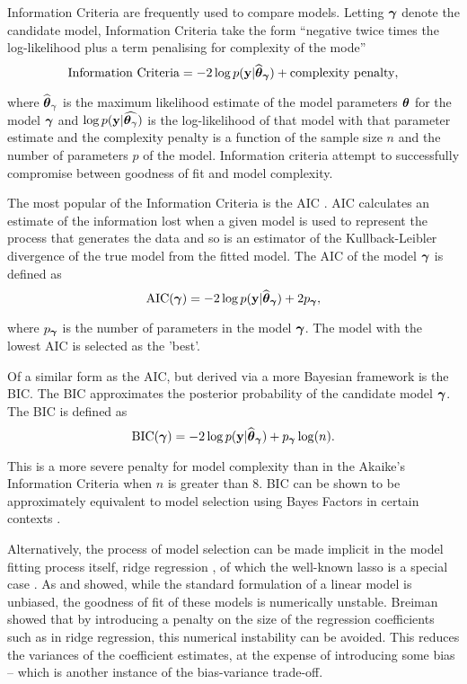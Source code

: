 
Information Criteria are frequently used to compare models. Letting ${\boldsymbol \gamma}$
denote the candidate model, Information Criteria take the form ``negative twice
times the log-likelihood plus a term penalising for complexity of the mode''
$$
	\text{Information Criteria} = -2 \log p({\bf y} | \widehat{{\boldsymbol \theta}}_{\boldsymbol \gamma}) + \text{complexity penalty},
$$

\noindent where $\widehat{{\boldsymbol \theta}}_{\gamma}$ is the maximum likelihood estimate of
the model parameters ${\boldsymbol \theta}$ for the model ${\boldsymbol \gamma}$ and $\log p({\bf y} |
\widehat{{\boldsymbol \theta}_\gamma})$ is the log-likelihood of that model with that
parameter estimate and the complexity penalty is a function of the sample size
$n$ and the number of parameters $p$ of the model. Information criteria attempt
to successfully compromise between goodness of fit and model complexity.

The most popular of the Information Criteria is the 
AIC \citep{Akaike1974}. AIC calculates an estimate of the information lost
when a given model is used to represent the process that generates the data and
so is an estimator of the Kullback-Leibler divergence of the true model from the
fitted model. The AIC of the model ${\boldsymbol \gamma}$ is defined as
$$
	\text{AIC}({\boldsymbol \gamma}) = -2 \log p({\bf y} | \widehat{{\boldsymbol \theta}}_{\boldsymbol \gamma}) + 2 p_{\boldsymbol \gamma},
$$

\noindent where $p_{\boldsymbol \gamma}$ is the number of parameters in the model ${\boldsymbol \gamma}$.
The model with the lowest AIC is selected as the 'best'.

Of a similar form as the AIC, but derived via a more Bayesian framework is the
BIC. The BIC approximates the posterior
probability of the candidate model ${\boldsymbol \gamma}$. The BIC is defined as
$$
	\text{BIC}({\boldsymbol \gamma}) = -2 \log p({\bf y} | \widehat{{\boldsymbol \theta}}_{\boldsymbol \gamma}) + p_{\boldsymbol \gamma} \log(n).
$$

\noindent This is a more severe penalty for model complexity than in the
Akaike's Information Criteria when $n$ is greater than $8$. BIC can be shown to
be approximately equivalent to model selection using Bayes Factors in certain
contexts \citep{Kass1993}.

Alternatively, the process of model selection can be made implicit in the model fitting
process itself, ridge regression \citep{Casella1980}, of which the well-known
lasso is a special case \citep{Tibshirani1996}. As \cite{Breiman1996} and
\cite{Efron2013} showed, while  the standard formulation of a linear model is
unbiased, the goodness of fit of these models is numerically  unstable. Breiman
showed that by introducing a penalty on the size of the regression coefficients
such as  in ridge regression, this numerical instability can be avoided. This
reduces the variances of the coefficient estimates, at the expense of
introducing some bias -- which is another instance of the bias-variance
trade-off.

